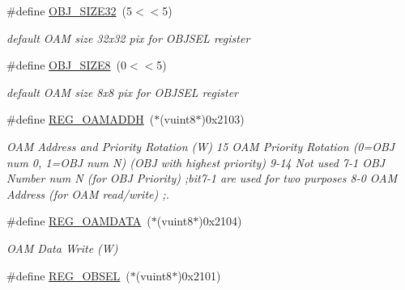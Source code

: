 \begin{DoxyCompactItemize}
\mbox{\label{a00365_abc6679a83d9647eac01c3d51ef37151a}} 
\#define \hyperlink{a00365_abc6679a83d9647eac01c3d51ef37151a}{O\+B\+J\+\_\+\+S\+I\+Z\+E32}~(5$<$$<$5)
\begin{DoxyCompactList}\small\item\em default O\+AM size 32x32 pix for O\+B\+J\+S\+EL register \end{DoxyCompactList}\item 
\mbox{\label{a00365_a6b25da5746274a43b4ffec5876fe8d5b}} 
\#define \hyperlink{a00365_a6b25da5746274a43b4ffec5876fe8d5b}{O\+B\+J\+\_\+\+S\+I\+Z\+E8}~(0$<$$<$5)
\begin{DoxyCompactList}\small\item\em default O\+AM size 8x8 pix for O\+B\+J\+S\+EL register \end{DoxyCompactList}\item 
\#define \hyperlink{a00365_ad8e30bb8ad62f2a58545ff770db95174}{R\+E\+G\+\_\+\+O\+A\+M\+A\+D\+DH}~($\ast$(vuint8$\ast$)0x2103)
\begin{DoxyCompactList}\small\item\em O\+AM Address and Priority Rotation (W) 15 O\+AM Priority Rotation (0=O\+BJ num 0, 1=O\+BJ num N) (O\+BJ with highest priority) 9-\/14 Not used 7-\/1 O\+BJ Number num N (for O\+BJ Priority) ;bit7-\/1 are used for two purposes 8-\/0 O\+AM Address (for O\+AM read/write) ;. \end{DoxyCompactList}\item 
\mbox{\label{a00365_ac7a5db74119e971459fad469a4caa92c}} 
\#define \hyperlink{a00365_ac7a5db74119e971459fad469a4caa92c}{R\+E\+G\+\_\+\+O\+A\+M\+D\+A\+TA}~($\ast$(vuint8$\ast$)0x2104)
\begin{DoxyCompactList}\small\item\em O\+AM Data Write (W) \end{DoxyCompactList}\item 
\mbox{\label{a00365_aa54aeab41da41947862d2317074d500a}} 
\#define \hyperlink{a00365_aa54aeab41da41947862d2317074d500a}{R\+E\+G\+\_\+\+O\+B\+S\+EL}~($\ast$(vuint8$\ast$)0x2101)

\end{DoxyCompactItemize}
